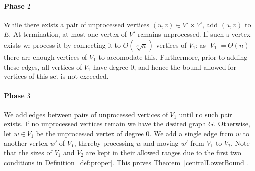 \paragraph{Phase $2$}
While there exists a pair of unprocessed vertices $(u,v)\in V'\times V'$, add $(u,v)$ to $E$. At termination, at most one vertex of $V'$ remains unprocessed. If such a vertex exists we process it by connecting it to $O(\sqrt[\alpha]n)$ vertices of $V_1$; as $\vert V_1\vert = \Theta(n)$ there are enough vertices of $V_1$ to accomodate this. Furthermore, prior to adding these edges, all vertices of $V_1$ have degree $0$, and hence the bound allowed for vertices of this set is not exceeded.

\vspace{-0.1cm}
\paragraph{Phase $3$}
We add edges between pairs of unprocessed vertices of $V_1$ until no such pair exists. If no unprocessed vertices remain we have the desired graph $G$. Otherwise, let $w\in V_1$ be the unprocessed vertex of degree $0$. We add a single edge from $w$ to another vertex $w'$ of $V_1$, thereby processing $w$ and moving $w'$ from $V_1$ to $V_2$. Note that the sizes of $V_1$ and $V_2$ are kept in their allowed ranges due to the first two conditions in Definition~\ref{def:proper}. This proves Theorem~\ref{centralLowerBound}.
